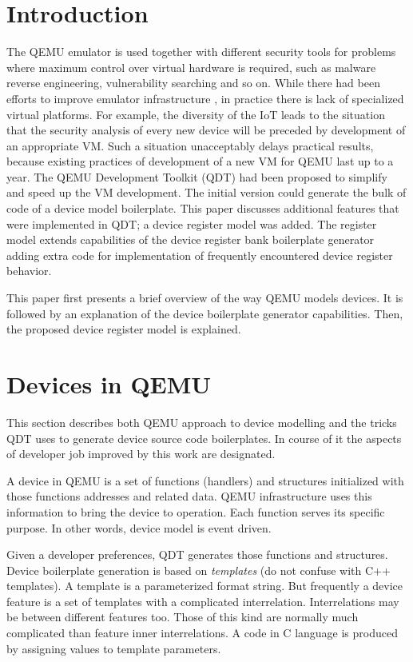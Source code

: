 \documentclass[conference,compsoc,a4paper]{IEEEtran}
\begin{document}
\section{Introduction}
The QEMU \cite{QEMU} emulator is used together with different security tools
for problems where
maximum control over virtual hardware is required, such as malware reverse
engineering,
vulnerability searching \cite{QEMUIdDynAn} and so on.
While there had been efforts to improve emulator infrastructure
\cite{QEMU-min-replay},
in practice there is lack of specialized virtual platforms.
For example, the diversity of the IoT leads to the situation that the security
analysis of every new device will be preceded by development of an appropriate
VM.
Such a situation unacceptably delays practical results, because existing
practices of development of a new VM for QEMU last up to a year.
The QEMU Development Toolkit (QDT) \cite{QDT} had been proposed to simplify and
speed up the VM development.
The initial version could generate the bulk of code of a device model
boilerplate.
This paper discusses additional features that were implemented in QDT; a device
register model was added.
The register model extends capabilities of the device register bank boilerplate
generator adding extra code for implementation of frequently encountered device
register behavior.

This paper first presents a brief overview of the way QEMU models devices.
It is followed by an explanation of the device boilerplate generator
capabilities.
Then, the proposed device register model is explained.

\section{Devices in QEMU}

This section describes both QEMU approach to device modelling and the tricks
QDT uses to generate device source code boilerplates.
In course of it the aspects of developer job improved by this work are
designated.

A device in QEMU is a set of functions (handlers) and structures initialized
with those functions addresses and related data.
QEMU infrastructure uses this information to bring the device to operation.
Each function serves its specific purpose.
In other words, device model is event driven.

Given a developer preferences, QDT generates those functions and structures.
Device boilerplate generation is based on \textit{templates} (do not confuse
with C++ templates).
A template is a parameterized format string.
But frequently a device feature is a set of templates with a complicated
interrelation.
Interrelations may be between different features too.
Those of this kind are normally much complicated than feature inner
interrelations.
A code in C language is produced by assigning values to template parameters.
\end{document}
